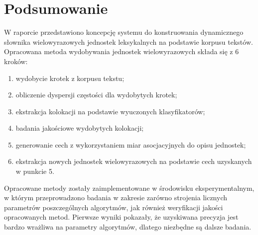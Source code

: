 \documentclass[11pt,a4paper]{llncs}
\begin{document}
\section{Podsumowanie} \label{s5}

W raporcie przedstawiono koncepcję systemu do konstruowania dynamicznego słownika wielowyrazowych jednostek leksykalnych na podstawie korpusu tekstów. Opracowana metoda wydobywania jednostek wielowyrazowych składa się z 6 kroków:
\begin{enumerate}
	\item wydobycie krotek z korpusu tekstu;
	\item obliczenie dyspersji częstości dla wydobytych krotek;
	\item ekstrakcja kolokacji na podstawie wyuczonych klasyfikatorów;
	\item badania jakościowe wydobytych kolokacji;
	\item generowanie cech z wykorzystaniem miar asocjacyjnych do opisu jednostek;
	\item ekstrakcja nowych jednostek wielowyrazowych na podstawie cech uzyskanych w punkcie 5.
\end{enumerate}

Opracowane metody zostały zaimplementowane w środowisku eksperymentalnym, w którym przeprowadzono badania w zakresie zarówno strojenia licznych parametrów poszczególnych algorytmów, jak również weryfikacji jakości opracowanych metod. Pierwsze wyniki pokazały, że uzyskiwana precyzja jest bardzo wrażliwa na parametry algorytmów, dlatego niezbędne są dalsze badania.
\end{document}

